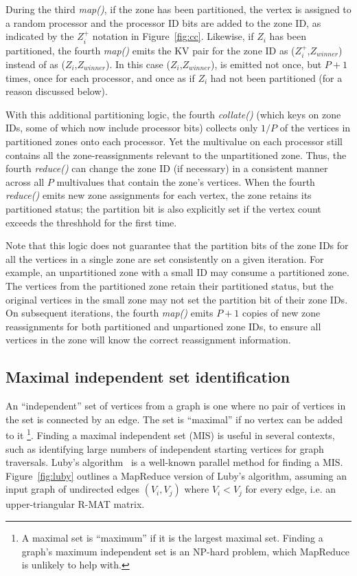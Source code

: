 During the third {\it map()}, if the zone has been partitioned, the
vertex is assigned to a random processor and the processor ID bits are
added to the zone ID, as indicated by the $Z_i^+$ notation in
Figure~\ref{fig:cc}.  Likewise, if $Z_i$ has been partitioned, the
fourth {\it map()} emits the KV pair for the zone ID as
($Z_i^+$,$Z_{winner}$) instead of as ($Z_i$,$Z_{winner}$).  In this
case ($Z_i$,$Z_{winner}$), is emitted not once, but $P+1$ times, once
for each processor, and once as if $Z_i$ had not been partitioned (for
a reason discussed below).

With this additional partitioning logic, the fourth {\it collate()}
(which keys on zone IDs, some of which now include processor bits)
collects only $1/P$ of the vertices in partitioned zones onto each
processor.  Yet the multivalue on each processor still contains all
the zone-reassignments relevant to the unpartitioned zone.  Thus, the
fourth {\it reduce()} can change the zone ID (if necessary) in a
consistent manner across all $P$ multivalues that contain the zone's
vertices.  When the fourth {\it reduce()} emits new zone assignments
for each vertex, the zone retains its partitioned status; the
partition bit is also explicitly set if the vertex count exceeds the
threshhold for the first time.

Note that this logic does not guarantee that the partition bits of the
zone IDs for all the vertices in a single zone are set consistently on
a given iteration.  For example, an unpartitioned zone with a small ID
may consume a partitioned zone.  The vertices from the partitioned
zone retain their partitioned status, but the original vertices in the
small zone may not set the partition bit of their zone IDs.  On
subsequent iterations, the fourth {\it map()} emits $P+1$ copies of
new zone reassignments for both partitioned and unpartioned zone IDs,
to ensure all vertices in the zone will know the correct reassignment
information.

\subsection{Maximal independent set identification}

An ``independent'' set of vertices from a graph is one where no pair
of vertices in the set is connected by an edge.  The set is
``maximal'' if no vertex can be added to it \footnote{A maximal set is
``maximum'' if it is the largest maximal set.  Finding a graph's
maximum independent set is an NP-hard problem, which MapReduce is
unlikely to help with.}.  Finding a maximal independent set (MIS) is
useful in several contexts, such as identifying large numbers of
independent starting vertices for graph traversals.  Luby's
algorithm~\cite{Luby86} is a well-known parallel method for finding a
MIS.  Figure~\ref{fig:luby} outlines a MapReduce version of Luby's
algorithm, assuming an input graph of undirected edges $(V_i,V_j)$
where $V_i < V_j$ for every edge, i.e. an upper-triangular R-MAT
matrix.

